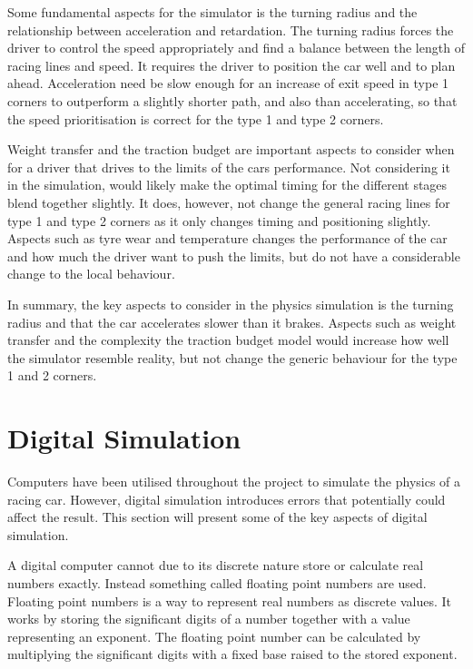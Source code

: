Some fundamental aspects for the simulator is the turning radius and the relationship between acceleration and retardation. The turning radius forces the driver to control the speed appropriately and find a balance between the length of racing lines and speed. It requires the driver to position the car well and to plan ahead. Acceleration need be slow enough for an increase of exit speed in type 1 corners to outperform a slightly shorter path, and also than accelerating, so that the speed prioritisation is correct for the type 1 and type 2 corners. 

Weight transfer and the traction budget are important aspects to consider when for a driver that drives to the limits of the cars performance. Not considering it in the simulation, would likely make the optimal timing for the different stages blend together slightly. It does, however, not change the general racing lines for type 1 and type 2 corners as it only changes timing and positioning slightly. Aspects such as tyre wear and temperature changes the performance of the car and how much the driver want to push the limits, but do not have a considerable change to the local behaviour. 

In summary, the key aspects to consider in the physics simulation is the turning radius and that the car accelerates slower than it brakes. Aspects such as weight transfer and the complexity the traction budget model would increase how well the simulator resemble reality, but not change the generic behaviour for the type 1 and 2 corners. 

\section{Digital Simulation}


Computers have been utilised throughout the project to simulate the physics of a racing car. However, digital simulation introduces errors that potentially could affect the result. This section will present some of the key aspects of digital simulation. 

A digital computer cannot due to its discrete nature store or calculate real numbers exactly. Instead something called floating point numbers are used. Floating point numbers is a way to represent real numbers as discrete values. It works by storing the significant digits of a number together with a value representing an exponent. The floating point number can be calculated by multiplying the significant digits with a fixed base raised to the stored exponent.

